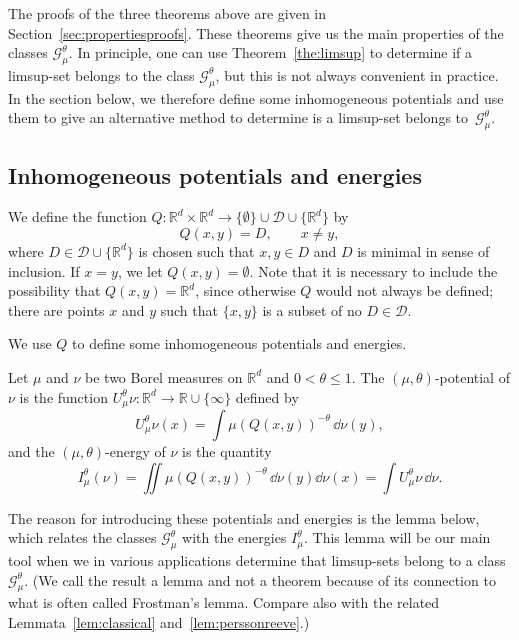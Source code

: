 The proofs of the three theorems above are given in Section~\ref{sec:propertiesproofs}. These theorems give us the main properties of the classes $\mathscr{G}_\mu^\theta$. In principle, one can use Theorem~\ref{the:limsup} to determine if a limsup-set belongs to the class $\mathscr{G}_\mu^\theta$, but this is not always convenient in practice. In the section below, we therefore define some inhomogeneous potentials and use them to give an alternative method to determine is a limsup-set belongs to~$\mathscr{G}_\mu^\theta$.


\subsection{Inhomogeneous potentials and energies} \label{sec:inhomogeneous}

We define the function $Q \colon \mathbb{R}^d \times \mathbb{R}^d \to \{\emptyset \} \cup \mathscr{D} \cup \{\mathbb{R}^d\}$ by
\[
Q (x,y) = D, \qquad x \neq y,
\]
where $D \in \mathscr{D} \cup \{ \mathbb{R}^d \}$ is chosen such that $x,y \in D$ and $D$ is minimal in sense of inclusion. If $x = y$, we let $Q (x,y) = \emptyset$. Note that it is necessary to include the possibility that $Q (x,y) = \mathbb{R}^d$, since otherwise $Q$ would not always be defined; there are points $x$ and $y$ such that $\{x, y\}$ is a subset of no $D \in \mathscr{D}$.

We use $Q$ to define some inhomogeneous potentials and energies.

\begin{defi}
Let $\mu$ and $\nu$ be two Borel measures on $\mathbb{R}^d$ and $0 < \theta \leq 1$. The $(\mu, \theta)$-potential of $\nu$ is the function $U_\mu^\theta \nu \colon \mathbb{R}^d \to \mathbb{R} \cup \{\infty\}$ defined by
\[
U_\mu^\theta \nu (x) = \int \mu (Q(x,y))^{-\theta} \, \dd \nu (y),
\]
and the $(\mu,\theta)$-energy of $\nu$ is the quantity
\[
I_\mu^\theta (\nu) = \iint \mu (Q(x,y))^{-\theta} \, \dd \nu (y) \dd \nu (x) = \int U_\mu^\theta \nu \, \dd \nu.
\]
\end{defi}

The reason for introducing these potentials and energies is the lemma below, which relates the classes $\mathscr{G}_\mu^\theta$ with the energies $I_\mu^\theta$. This lemma will be our main tool when we in various applications determine that limsup-sets belong to a class $\mathscr{G}_\mu^\theta$. (We call the result a lemma and not a theorem because of its connection to what is often called Frostman's lemma. Compare also with the related Lemmata~\ref{lem:classical} and~\ref{lem:perssonreeve}.)

